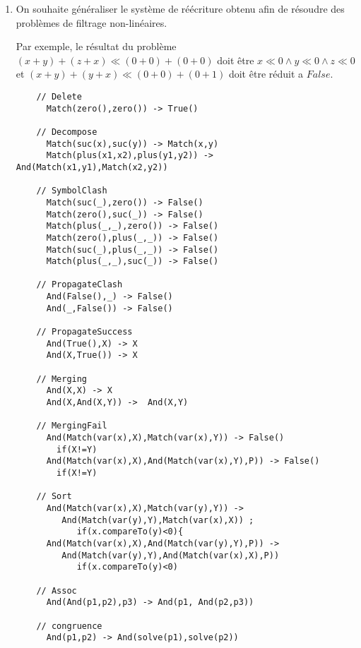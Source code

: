 \documentclass[11pt]{article}
\begin{document}
\begin{enumerate}
\item
On souhaite généraliser le système de réécriture obtenu afin de
résoudre des problèmes de filtrage non-linéaires.

Par exemple, le résultat du problème $(x+y)+(z+x) \ll (0+0)+(0+0)$
doit être $x\ll 0 \wedge y\ll 0 \wedge z\ll 0$ et $(x+y)+(y+x) \ll
(0+0)+(0+1)$ doit être réduit a $False$.

\begin{versionProf}
\begin{verbatim}
    // Delete
      Match(zero(),zero()) -> True()
      
    // Decompose
      Match(suc(x),suc(y)) -> Match(x,y)
      Match(plus(x1,x2),plus(y1,y2)) -> And(Match(x1,y1),Match(x2,y2))
        
    // SymbolClash
      Match(suc(_),zero()) -> False() 
      Match(zero(),suc(_)) -> False() 
      Match(plus(_,_),zero()) -> False() 
      Match(zero(),plus(_,_)) -> False() 
      Match(suc(_),plus(_,_)) -> False() 
      Match(plus(_,_),suc(_)) -> False() 

    // PropagateClash
      And(False(),_) -> False()
      And(_,False()) -> False()

    // PropagateSuccess
      And(True(),X) -> X
      And(X,True()) -> X

    // Merging
      And(X,X) -> X
      And(X,And(X,Y)) ->  And(X,Y)

    // MergingFail
      And(Match(var(x),X),Match(var(x),Y)) -> False() 
        if(X!=Y)
      And(Match(var(x),X),And(Match(var(x),Y),P)) -> False() 
        if(X!=Y)

    // Sort
      And(Match(var(x),X),Match(var(y),Y)) -> 
         And(Match(var(y),Y),Match(var(x),X)) ;
            if(x.compareTo(y)<0){
      And(Match(var(x),X),And(Match(var(y),Y),P)) -> 
         And(Match(var(y),Y),And(Match(var(x),X),P)) 
            if(x.compareTo(y)<0)
    
    // Assoc
      And(And(p1,p2),p3) -> And(p1, And(p2,p3))

    // congruence
      And(p1,p2) -> And(solve(p1),solve(p2))
\end{verbatim}
\end{versionProf}
\end{enumerate}
\end{document}
